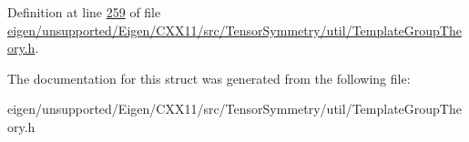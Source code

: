 Definition at line \hyperlink{eigen_2unsupported_2_eigen_2_c_x_x11_2src_2_tensor_symmetry_2util_2_template_group_theory_8h_source_l00259}{259} of file \hyperlink{eigen_2unsupported_2_eigen_2_c_x_x11_2src_2_tensor_symmetry_2util_2_template_group_theory_8h_source}{eigen/unsupported/\+Eigen/\+C\+X\+X11/src/\+Tensor\+Symmetry/util/\+Template\+Group\+Theory.\+h}.



The documentation for this struct was generated from the following file\+:\begin{DoxyCompactItemize}
\item 
eigen/unsupported/\+Eigen/\+C\+X\+X11/src/\+Tensor\+Symmetry/util/\+Template\+Group\+Theory.\+h\end{DoxyCompactItemize}
